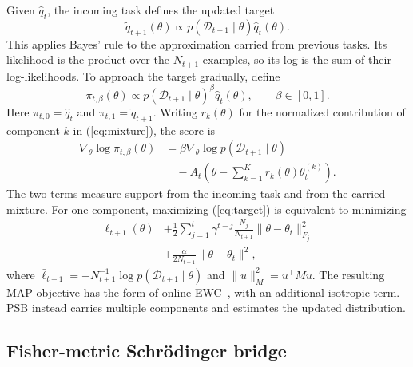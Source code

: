 Given $\hat q_t$, the incoming task defines the updated target
\begin{equation}
    \tilde q_{t+1}(\theta)\propto
    p(\mathcal{D}_{t+1}\mid\theta)\hat q_t(\theta).
    \label{eq:target}
\end{equation}
This applies Bayes' rule to the approximation carried from previous tasks.
Its likelihood is the product over the $N_{t+1}$ examples, so its log is
the sum of their log-likelihoods. To approach the target gradually, define
\begin{equation}
    \pi_{t,\beta}(\theta)\propto
    p(\mathcal{D}_{t+1}\mid\theta)^\beta\hat q_t(\theta),
    \qquad \beta\in[0,1].
    \label{eq:tempered}
\end{equation}
Here $\pi_{t,0}=\hat q_t$ and $\pi_{t,1}=\tilde q_{t+1}$. Writing
$r_k(\theta)$ for the normalized contribution of component $k$ in
(\ref{eq:mixture}), the score is
\begin{equation}
\begin{split}
    \nabla_\theta\log\pi_{t,\beta}(\theta)
    &=\beta\nabla_\theta\log p(\mathcal{D}_{t+1}\mid\theta)\\
    &\quad-A_t\left(\theta-
    \sum_{k=1}^{K}r_k(\theta)\theta_t^{(k)}\right).
\end{split}
    \label{eq:pathscore}
\end{equation}
The two terms measure support from the incoming task and from the carried
mixture. For one component, maximizing (\ref{eq:target}) is equivalent to
minimizing
\begin{equation}
\begin{split}
    \bar\ell_{t+1}(\theta)
    &+\frac{1}{2}\sum_{j=1}^{t}\gamma^{t-j}
    \frac{N_j}{N_{t+1}}\|\theta-\theta_t\|_{F_j}^{2}\\
    &+\frac{\alpha}{2N_{t+1}}\|\theta-\theta_t\|^2,
\end{split}
    \label{eq:ewc}
\end{equation}
where $\bar\ell_{t+1}=-N_{t+1}^{-1}\log
p(\mathcal{D}_{t+1}\mid\theta)$ and $\|u\|_M^2=u^\top Mu$.
The resulting MAP objective has the form of online
EWC~\cite{kirkpatrick2017ewc,schwarz2018progress}, with an additional
isotropic term. PSB instead carries multiple components and estimates the
updated distribution.

\subsection{Fisher-metric Schr\"odinger bridge}
\label{sec:bridge}

